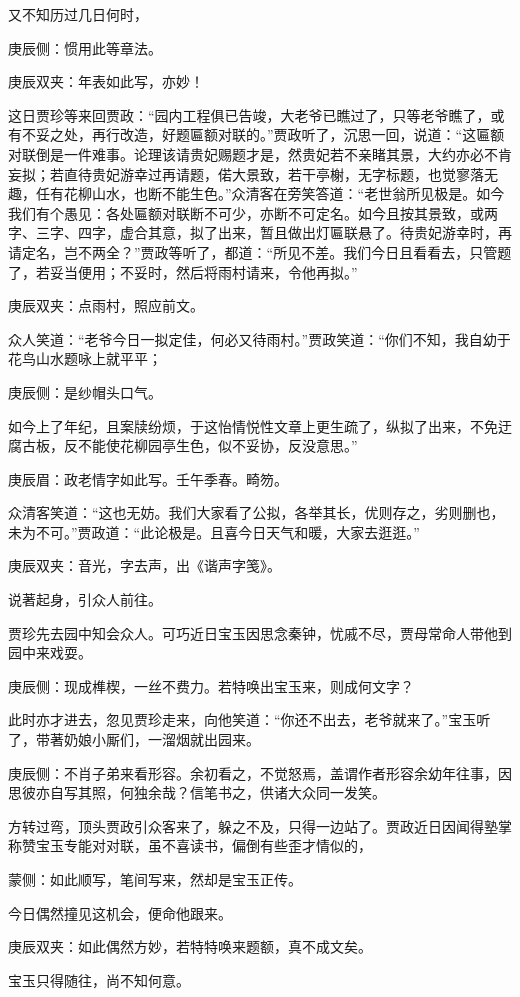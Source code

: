 \begin{parag}
    又不知历过几日何时，\begin{note}庚辰侧：惯用此等章法。\end{note}\begin{note}庚辰双夹：年表如此写，亦妙！\end{note}这日贾珍等来回贾政：“园内工程俱已告竣，大老爷已瞧过了，只等老爷瞧了，或有不妥之处，再行改造，好题匾额对联的。”贾政听了，沉思一回，说道：“这匾额对联倒是一件难事。论理该请贵妃赐题才是，然贵妃若不亲睹其景，大约亦必不肯妄拟；若直待贵妃游幸过再请题，偌大景致，若干亭榭，无字标题，也觉寥落无趣，任有花柳山水，也断不能生色。”众清客在旁笑答道：“老世翁所见极是。如今我们有个愚见：各处匾额对联断不可少，亦断不可定名。如今且按其景致，或两字、三字、四字，虚合其意，拟了出来，暂且做出灯匾联悬了。待贵妃游幸时，再请定名，岂不两全？”贾政等听了，都道：“所见不差。我们今日且看看去，只管题了，若妥当便用；不妥时，然后将雨村请来，令他再拟。”\begin{note}庚辰双夹：点雨村，照应前文。\end{note}众人笑道：“老爷今日一拟定佳，何必又待雨村。”贾政笑道：“你们不知，我自幼于花鸟山水题咏上就平平；\begin{note}庚辰侧：是纱帽头口气。\end{note}如今上了年纪，且案牍纷烦，于这怡情悦性文章上更生疏了，纵拟了出来，不免迂腐古板，反不能使花柳园亭生色，似不妥协，反没意思。”\begin{note}庚辰眉：政老情字如此写。壬午季春。畸笏。\end{note}众清客笑道：“这也无妨。我们大家看了公拟，各举其长，优则存之，劣则删也，未为不可。”贾政道：“此论极是。且喜今日天气和暖，大家去逛逛。”\begin{note}庚辰双夹：音光，字去声，出《谐声字笺》。\end{note}说著起身，引众人前往。
\end{parag}


\begin{parag}
    贾珍先去园中知会众人。可巧近日宝玉因思念秦钟，忧戚不尽，贾母常命人带他到园中来戏耍。\begin{note}庚辰侧：现成榫楔，一丝不费力。若特唤出宝玉来，则成何文字？\end{note}此时亦才进去，忽见贾珍走来，向他笑道：“你还不出去，老爷就来了。”宝玉听了，带著奶娘小厮们，一溜烟就出园来。\begin{note}庚辰侧：不肖子弟来看形容。余初看之，不觉怒焉，盖谓作者形容余幼年往事，因思彼亦自写其照，何独余哉？信笔书之，供诸大众同一发笑。\end{note}方转过弯，顶头贾政引众客来了，躲之不及，只得一边站了。贾政近日因闻得塾掌称赞宝玉专能对对联，虽不喜读书，偏倒有些歪才情似的，\begin{note}蒙侧：如此顺写，笔间写来，然却是宝玉正传。\end{note}今日偶然撞见这机会，便命他跟来。\begin{note}庚辰双夹：如此偶然方妙，若特特唤来题额，真不成文矣。\end{note}宝玉只得随往，尚不知何意。
\end{parag}


